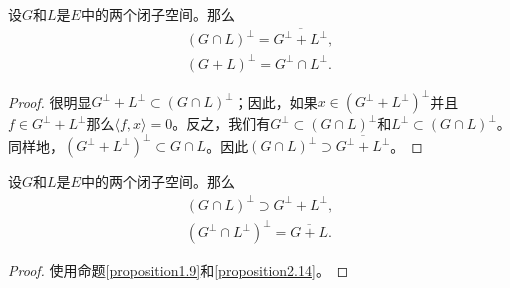 \begin{proposition}\label{proposition2.14}
设$G$和$L$是$E$中的两个闭子空间。那么
\begin{gather}
(G \cap L)^\perp = \overline{G^\perp + L^\perp}, \label{eq:2.16} \\
(G+L)^\perp = G^\perp \cap L^\perp. \label{eq:2.17}
\end{gather}
\end{proposition}
\begin{proof}
很明显$G^\perp + L^\perp \subset (G \cap L)^\perp$；因此，如果$x \in (G^\perp+L^\perp)^\perp$并且$f \in G^\perp+L^\perp$那么$\langle f, x \rangle=0$。反之，我们有$G^\perp \subset (G \cap L)^\perp$和$L^\perp \subset (G \cap L)^\perp$。同样地，$(G^\perp+L^\perp)^\perp \subset G \cap L$。因此$(G \cap L)^\perp \supset \overline{G^\perp+L^\perp}$。
\end{proof}

\begin{corollary}\label{corollary2.15}
设$G$和$L$是$E$中的两个闭子空间。那么
\begin{gather}
(G \cap L)^\perp \supset G^\perp+L^\perp, \label{eq:2.18} \\
(G^\perp \cap L^\perp)^\perp = \overline{G+L}. \label{eq:2.19}
\end{gather}
\end{corollary}
\begin{proof}
使用命题\ref{proposition1.9}和\ref{proposition2.14}。
\end{proof}

